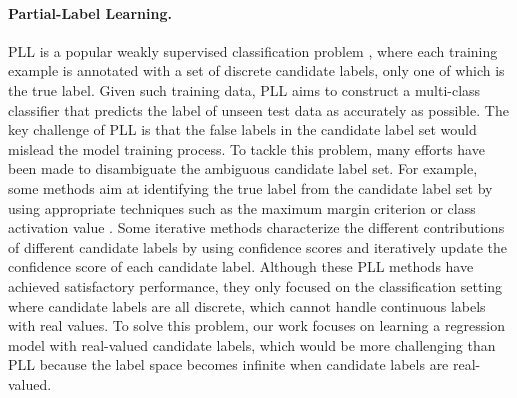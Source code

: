 \documentclass[letterpaper]{article} %
\begin{document}
\paragraph{Partial-Label Learning.} PLL is a popular weakly supervised classification problem \cite{gong2021top,gong2022partial}, where each training example is annotated with a set of discrete candidate labels, only one of which is the true label. Given such training data, PLL aims to construct a multi-class classifier that predicts the label of unseen test data as accurately as possible. The key challenge of PLL is that the false labels in the candidate label set would mislead the model training process. To tackle this problem, many efforts have been made to disambiguate the ambiguous candidate label set. For example, some methods aim at identifying the true label from the candidate label set by using appropriate techniques such as the maximum margin criterion \cite{nguyen2008classification,yu2016maximum} or class activation value \cite{zhang2022exploiting}. Some iterative methods \cite{feng2019partial,lv2020progressive,feng2020provably} characterize the different contributions of different candidate labels by using confidence scores and iteratively update the confidence score of each candidate label. Although these PLL methods have achieved satisfactory performance, they only focused on the classification setting where candidate labels are all discrete, which cannot handle continuous labels with real values. To solve this problem, our work focuses on learning a regression model with real-valued candidate labels, which would be more challenging than PLL because the label space becomes infinite when candidate labels are real-valued. 
\end{document}
